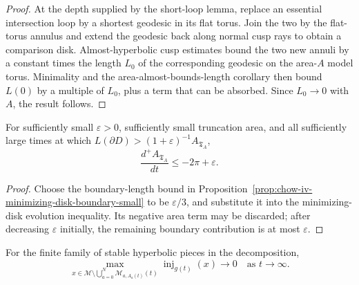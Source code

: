 \begin{proof}
\sketch
At the depth supplied by the short-loop lemma, replace an essential
intersection loop by a shortest geodesic in its flat torus.  Join the two by
the flat-torus annulus and extend the geodesic back along normal cusp rays to
obtain a comparison disk.  Almost-hyperbolic cusp estimates bound the two new
annuli by a constant times the length \(L_0\) of the corresponding geodesic on
the area-\(A\) model torus.  Minimality and the area-almost-bounds-length
corollary then bound \(L(0)\) by a multiple of \(L_0\), plus a term that can be
absorbed.  Since \(L_0\to0\) with \(A\), the result follows.
\end{proof}

\begin{lemma}
\label{lem:chow-iv-area-decay-long-boundary}


For sufficiently small \(\varepsilon>0\), sufficiently small truncation area,
and all sufficiently large times at which
\(L(\partial D)>(1+\varepsilon)^{-1}A_{\mathfrak T_A}\),
\[
 \frac{d^+A_{\mathfrak T_A}}{dt}\le-2\pi+\varepsilon.
\]
\end{lemma}

\begin{proof}
\sketch
Choose the boundary-length bound in Proposition~\ref{prop:chow-iv-minimizing-disk-boundary-small}
to be \(\varepsilon/3\), and substitute it into the minimizing-disk evolution
inequality.  Its negative area term may be discarded; after decreasing
\(\varepsilon\) initially, the remaining boundary contribution is at most
\(\varepsilon\).
\end{proof}

\begin{claim}
\label{ex:chow-iv-collapsed-complement-injectivity-zero}
For the finite family of stable hyperbolic pieces in the decomposition,
\[
 \max_{x\in\mathcal M\setminus\bigcup_{a=0}^N\mathcal M_{a,A_a(t)}(t)}
 \operatorname{inj}_{g(t)}(x)\longrightarrow0
 \quad\text{as }t\to\infty.
\]
\end{claim}
